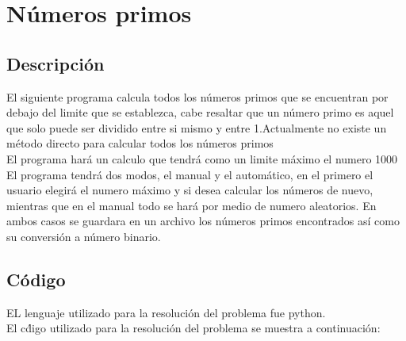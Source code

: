 \documentclass[12pt,letterpaper]{article}
\begin{document}
\section{N\'umeros primos}
\subsection{Descripci\'on}
\justify
El siguiente programa calcula todos los n\'umeros primos que se encuentran por debajo del limite que se establezca, cabe resaltar que un n\'umero primo es aquel que solo puede ser dividido entre si mismo y entre 1.Actualmente no existe un m\'etodo directo para calcular todos los n\'umeros primos\\
El programa har\'a un calculo que tendr\'a como un limite m\'aximo el numero 1000\\
El programa tendr\'a dos modos, el manual y el autom\'atico, en el primero el usuario elegir\'a el numero m\'aximo y si desea calcular los n\'umeros de nuevo, mientras que en el manual todo se har\'a por medio de numero aleatorios. En ambos casos se guardara en un archivo los n\'umeros primos encontrados as\'i como su conversi\'on a n\'umero binario.\\
\subsection{C\'odigo}
\justify
EL lenguaje utilizado para la resoluci\'on del problema fue python.\\
El c\'digo utilizado para la resoluci\'on del problema se muestra a continuaci\'on:\\
\end{document}
